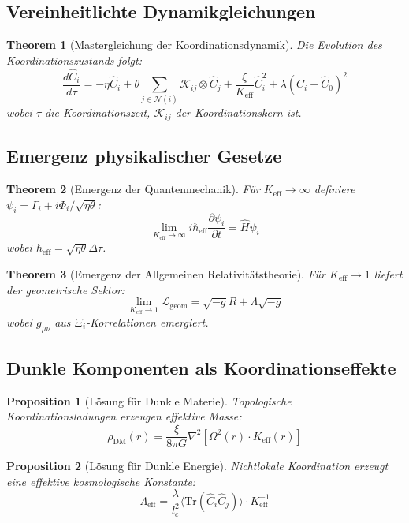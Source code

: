 \documentclass[11pt,a4paper]{article}
\newtheorem{theorem}{Theorem}
\newtheorem{proposition}{Proposition}
\begin{document}
	\subsection{Vereinheitlichte Dynamikgleichungen}
	
	\begin{theorem}[Mastergleichung der Koordinationsdynamik]
		Die Evolution des Koordinationszustands folgt:
		\[
		\frac{d\hat{C}_i}{d\tau} = -\eta \hat{C}_i + \theta \sum_{j \in \mathcal{N}(i)} \mathcal{K}_{ij} \otimes \hat{C}_j + \frac{\xi}{K_{\mathrm{eff}}} \hat{C}_i^2 + \lambda (\hat{C}_i - \hat{C}_0)^2
		\]
		wobei $\tau$ die Koordinationszeit, $\mathcal{K}_{ij}$ der Koordinationskern ist.
	\end{theorem}
	
	\subsection{Emergenz physikalischer Gesetze}
	
	\begin{theorem}[Emergenz der Quantenmechanik]
		Für $K_{\mathrm{eff}} \to \infty$ definiere $\psi_i = \Gamma_i + i\Phi_i/\sqrt{\eta\theta}$:
		\[
		\lim_{K_{\mathrm{eff}} \to \infty} i\hbar_{\mathrm{eff}}\frac{\partial\psi_i}{\partial t} = \hat{H}\psi_i
		\]
		wobei $\hbar_{\mathrm{eff}} = \sqrt{\eta\theta}\Delta\tau$.
	\end{theorem}
	
	\begin{theorem}[Emergenz der Allgemeinen Relativitätstheorie]  
		Für $K_{\mathrm{eff}} \to 1$ liefert der geometrische Sektor:
		\[
		\lim_{K_{\mathrm{eff}} \to 1} \mathcal{L}_{\mathrm{geom}} = \sqrt{-g}R + \Lambda\sqrt{-g}
		\]
		wobei $g_{\mu\nu}$ aus $\Xi_i$-Korrelationen emergiert.
	\end{theorem}
	
	\subsection{Dunkle Komponenten als Koordinationseffekte}
	
	\begin{proposition}[Lösung für Dunkle Materie]
		Topologische Koordinationsladungen erzeugen effektive Masse:
		\[
		\rho_{\mathrm{DM}}(r) = \frac{\xi}{8\pi G} \nabla^2 \left[ \Omega^2(r) \cdot K_{\mathrm{eff}}(r) \right]
		\]
	\end{proposition}
	
	\begin{proposition}[Lösung für Dunkle Energie]
		Nichtlokale Koordination erzeugt eine effektive kosmologische Konstante:
		\[
		\Lambda_{\mathrm{eff}} = \frac{\lambda}{l_c^2} \langle \mathrm{Tr}(\hat{C}_i\hat{C}_j) \rangle \cdot K_{\mathrm{eff}}^{-1}
		\]
	\end{proposition}
	
\end{document}
